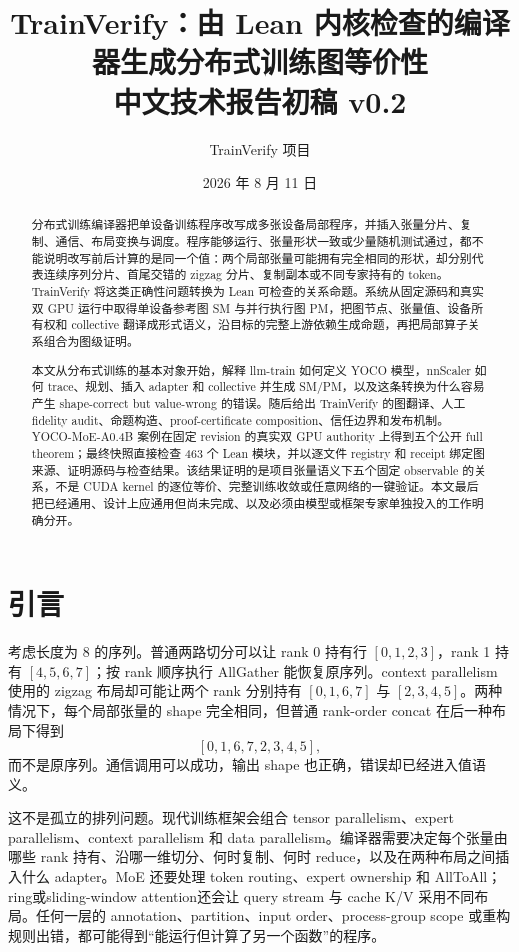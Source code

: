 \documentclass[10.5pt,a4paper]{ctexart}
\title{TrainVerify：由 Lean 内核检查的编译器生成分布式训练图等价性\\\large 中文技术报告初稿 v0.2}
\author{TrainVerify 项目}
\date{2026 年 8 月 11 日}
\begin{document}
\maketitle

\begin{abstract}
分布式训练编译器把单设备训练程序改写成多张设备局部程序，并插入张量分片、复制、通信、布局变换与调度。程序能够运行、张量形状一致或少量随机测试通过，都不能说明改写前后计算的是同一个值：两个局部张量可能拥有完全相同的形状，却分别代表连续序列分片、首尾交错的 zigzag 分片、复制副本或不同专家持有的 token。TrainVerify 将这类正确性问题转换为 Lean 可检查的关系命题。系统从固定源码和真实双 GPU 运行中取得单设备参考图 SM 与并行执行图 PM，把图节点、张量值、设备所有权和 collective 翻译成形式语义，沿目标的完整上游依赖生成命题，再把局部算子关系组合为图级证明。

本文从分布式训练的基本对象开始，解释 llm-train 如何定义 YOCO 模型，nnScaler 如何 trace、规划、插入 adapter 和 collective 并生成 SM/PM，以及这条转换为什么容易产生 shape-correct but value-wrong 的错误。随后给出 TrainVerify 的图翻译、人工 fidelity audit、命题构造、proof-certificate composition、信任边界和发布机制。YOCO-MoE-A0.4B 案例在固定 revision 的真实双 GPU authority 上得到五个公开 full theorem；最终快照直接检查 463 个 Lean 模块，并以逐文件 registry 和 receipt 绑定图来源、证明源码与检查结果。该结果证明的是项目张量语义下五个固定 observable 的关系，不是 CUDA kernel 的逐位等价、完整训练收敛或任意网络的一键验证。本文最后把已经通用、设计上应通用但尚未完成、以及必须由模型或框架专家单独投入的工作明确分开。
\end{abstract}

\section{引言}

考虑长度为 8 的序列。普通两路切分可以让 rank 0 持有行 $[0,1,2,3]$，rank 1 持有 $[4,5,6,7]$；按 rank 顺序执行 AllGather 能恢复原序列。context parallelism 使用的 zigzag 布局却可能让两个 rank 分别持有 $[0,1,6,7]$ 与 $[2,3,4,5]$。两种情况下，每个局部张量的 shape 完全相同，但普通 rank-order concat 在后一种布局下得到
\[
[0,1,6,7,2,3,4,5],
\]
而不是原序列。通信调用可以成功，输出 shape 也正确，错误却已经进入值语义。

这不是孤立的排列问题。现代训练框架会组合 tensor parallelism、expert parallelism、context parallelism 和 data parallelism。编译器需要决定每个张量由哪些 rank 持有、沿哪一维切分、何时复制、何时 reduce，以及在两种布局之间插入什么 adapter。MoE 还要处理 token routing、expert ownership 和 AllToAll；ring或sliding-window attention还会让 query stream 与 cache K/V 采用不同布局。任何一层的 annotation、partition、input order、process-group scope 或重构规则出错，都可能得到“能运行但计算了另一个函数”的程序。
\end{document}
